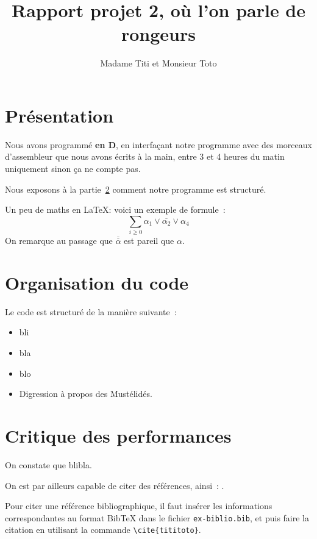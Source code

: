 \documentclass{article}
\title{Rapport projet 2, où l'on parle de rongeurs}
\author{Madame Titi et Monsieur Toto}
\date{}
\newcommand{\litt}{\alpha}
\newcommand{\non}[1]{\overline{#1}}
\begin{document}
\maketitle

\section{Présentation}

Nous avons programmé \textbf{en D}, en interfaçant notre programme
avec des morceaux d'assembleur que nous avons écrits à la main, entre
3 et 4 heures du matin uniquement sinon ça ne compte pas.



Nous exposons à la partie~\ref{s:orga} comment notre programme est structuré.


Un peu de maths en \LaTeX: voici un exemple de formule~:
$$
\sum_{i\geq 0} \litt_1\lor\non{\litt_2}\lor\litt_4
$$
On remarque au passage que $\non{\non{\litt}}$ est pareil que $\litt$.

\section{Organisation du code}
\label{s:orga}

Le code est structuré de la manière suivante~:
\begin{itemize}
\item bli
\item bla
\item blo
\item Digression à propos des Mustélidés.
\end{itemize}

\section{Critique des performances}

On constate que blibla.


On est par ailleurs capable de citer des références, ainsi~: \cite{ProjInt16}.

\medskip

Pour citer une référence bibliographique, il faut insérer les
informations correspondantes au format BibTeX dans le fichier
\texttt{ex-biblio.bib}, et puis faire la citation en utilisant la
commande \verb+\cite{tititoto}+.
\end{document}
